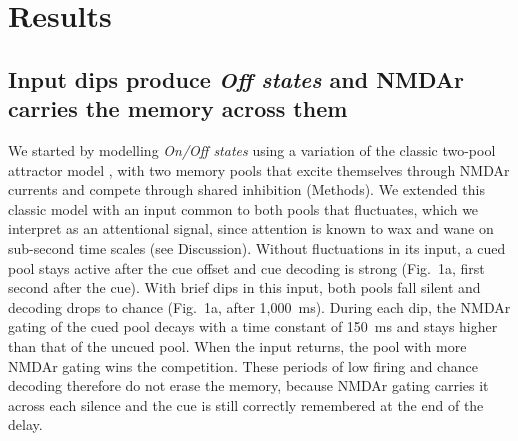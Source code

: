 \documentclass[11pt]{article}
\begin{document}
\section{Results}

\subsection{Input dips produce \emph{Off states} and NMDAr carries the memory across them}

We started by modelling \emph{On/Off states} using a variation of the classic two-pool attractor model \citep{wang2002,wong2006}, with two memory pools that excite themselves through NMDAr currents and compete through shared inhibition (Methods). We extended this classic model with an input common to both pools that fluctuates, which we interpret as an attentional signal, since attention is known to wax and wane on sub-second time scales (see Discussion). Without fluctuations in its input, a cued pool stays active after the cue offset and cue decoding is strong (Fig.~1a, first second after the cue). With brief dips in this input, both pools fall silent and decoding drops to chance (Fig.~1a, after 1,000~ms). During each dip, the NMDAr gating of the cued pool decays with a time constant of 150~ms and stays higher than that of the uncued pool. When the input returns, the pool with more NMDAr gating wins the competition. These periods of low firing and chance decoding therefore do not erase the memory, because NMDAr gating carries it across each silence and the cue is still correctly remembered at the end of the delay.
\end{document}
